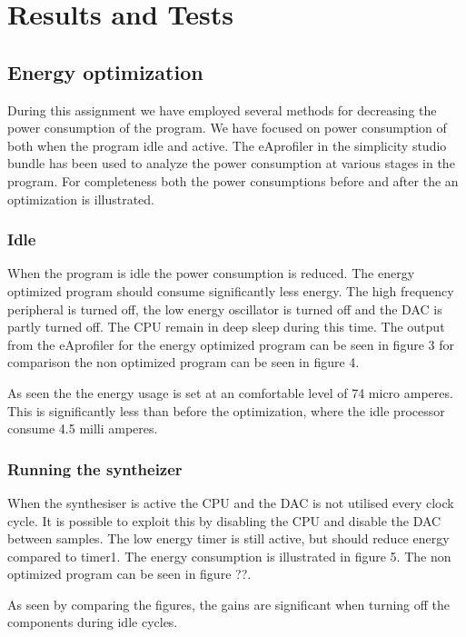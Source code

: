 \section{Results and Tests}

\subsection{Energy optimization}
During this assignment we have employed several methods for decreasing the power consumption of the program. We have focused on power consumption of both when the program idle and active. The eAprofiler in the simplicity studio bundle has been used to analyze the power consumption at various stages in the program. For completeness both the power consumptions before and after the an optimization is illustrated.


\subsubsection{Idle}
When the program is idle the power consumption is reduced. The energy optimized program should consume   significantly less energy. The high frequency peripheral is turned off, the low energy oscillator is turned off and the DAC is partly turned off. The CPU remain in deep sleep during this time. The output from the eAprofiler for the energy optimized program can be seen in figure 3 for comparison the non optimized program can be seen in figure 4. 





As seen the the energy usage is set at an comfortable level of 74 micro amperes. This is significantly less than before the optimization, where the idle processor consume 4.5 milli amperes.  


\subsubsection{Running the syntheizer}
When the synthesiser is active the CPU and the DAC is not utilised every clock cycle. It is possible to exploit this by disabling the CPU and disable the DAC between samples. The low energy timer is still active, but should reduce energy compared to timer1. The energy consumption is illustrated in figure 5. The non optimized program can be seen in figure ??.    




As seen by comparing the figures, the gains are significant when turning off the components during idle cycles. 



